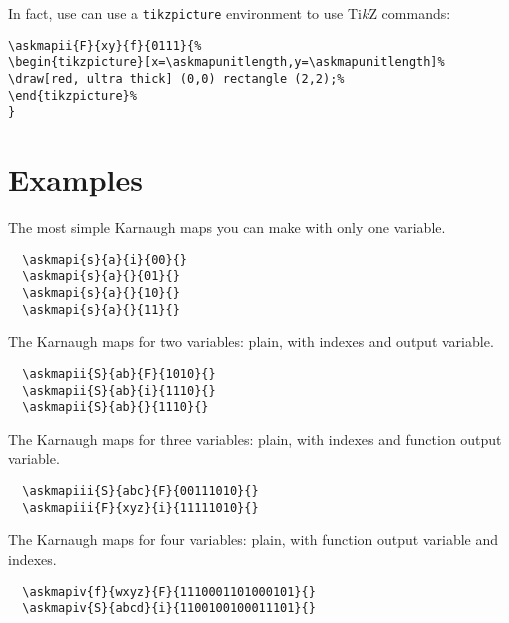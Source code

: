 \documentclass[a4paper,10pt]{ltxdoc}
\begin{document}
\bigskip
In fact, use can use a \texttt{tikzpicture} environment to use Ti\textsl{k}Z commands:

\begin{verbatim}
\askmapii{F}{xy}{f}{0111}{%
\begin{tikzpicture}[x=\askmapunitlength,y=\askmapunitlength]%
\draw[red, ultra thick] (0,0) rectangle (2,2);%
\end{tikzpicture}%
}
\end{verbatim}


\section{Examples}
\label{sec:examples}
\askmapunitlength=0.88cm
The most simple Karnaugh maps you can make with only one variable.
\begin{verbatim}
  \askmapi{s}{a}{i}{00}{}
  \askmapi{s}{a}{}{01}{}
  \askmapi{s}{a}{}{10}{}
  \askmapi{s}{a}{}{11}{}
\end{verbatim}
%
%
%
%
\bigskip\bigskip

The Karnaugh maps for two variables: plain, with indexes and output
variable.
\begin{verbatim}
  \askmapii{S}{ab}{F}{1010}{}
  \askmapii{S}{ab}{i}{1110}{}
  \askmapii{S}{ab}{}{1110}{}
\end{verbatim}
\bigskip\bigskip

The Karnaugh maps for three variables: plain, with indexes and function
output variable.
\begin{verbatim}
  \askmapiii{S}{abc}{F}{00111010}{}
  \askmapiii{F}{xyz}{i}{11111010}{}
\end{verbatim}
\bigskip\bigskip

The Karnaugh maps for four variables: plain, with function output variable and
indexes.
\begin{verbatim}
  \askmapiv{f}{wxyz}{F}{1110001101000101}{}
  \askmapiv{S}{abcd}{i}{1100100100011101}{}
\end{verbatim}
\bigskip\bigskip
\end{document}
